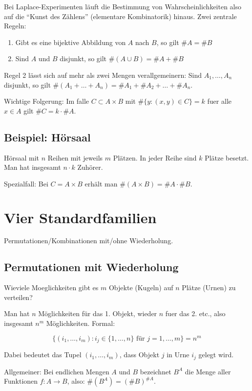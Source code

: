 Bei Laplace-Experimenten läuft die Bestimmung von Wahrscheinlichkeiten also
auf die ``Kunst des Zählens'' (elementare Kombinatorik) hinaus. Zwei zentrale
Regeln:

\begin{enumerate}
\item Gibt es eine bijektive Abbildung von $A$ nach $B$, so gilt $\#A = \#B$
\item Sind $A$ und $B$ disjunkt, so gilt $\#(A \cup B) = \#A + \#B$
\end{enumerate}

Regel 2 lässt sich auf mehr als zwei Mengen verallgemeinern: Sind
$A_1,\ldots,A_n$ disjunkt, so gilt $\#(A_1 + \ldots + A_n) = \#A_1 + \#A_2 +
\ldots + \#A_n$.

Wichtige Folgerung: Im falle $C \subset A \times B$ mit $\#\{ y : (x,y) \in C
\} = k$ fuer alle $x \in A$ gilt $\#C = k \cdot \#A$.


\subsection{Beispiel: Hörsaal}

Hörsaal mit $n$ Reihen mit jeweils $m$ Plätzen. In jeder Reihe sind $k$
Plätze besetzt. Man hat insgesamt $n \cdot k$ Zuhörer.

Spezialfall: Bei $C = A \times B$ erhält man $\#(A \times B) = \#A \cdot \#B$.


\section{Vier Standardfamilien}

Permutationen/Kombinationen mit/ohne Wiederholung.

\subsection{Permutationen mit Wiederholung}

Wieviele Moeglichkeiten gibt es $m$ Objekte (Kugeln) auf $n$ Plätze (Urnen) zu
verteilen?

Man hat $n$ Möglichkeiten für das 1. Objekt, wieder $n$ fuer das 2. etc.,
also insgesamt $n^m$ Möglichkeiten. Formal:

\[ \{ (i_1,\ldots,i_m) : i_j \in \{ 1,\ldots,n \} \text{ für } j = 1,\ldots,m
\} = n^m \]

Dabei bedeutet das Tupel $(i_1,\ldots,i_m)$, dass Objekt $j$ in Urne $i_j$
gelegt wird.

Allgemeiner: Bei endlichen Mengen $A$ und $B$ bezeichnet $B^A$ die Menge aller
Funktionen $f: A \to B$, also: $\#(B^A) = (\#B)^{\#A}$.



